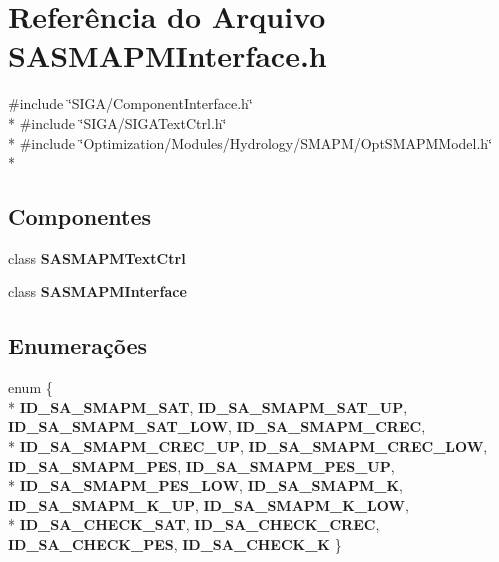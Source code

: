 \section{Referência do Arquivo S\+A\+S\+M\+A\+P\+M\+Interface.\+h}
\label{_s_a_s_m_a_p_m_interface_8h}
{\ttfamily \#include \char`\"{}S\+I\+G\+A/\+Component\+Interface.\+h\char`\"{}}\\*
{\ttfamily \#include \char`\"{}S\+I\+G\+A/\+S\+I\+G\+A\+Text\+Ctrl.\+h\char`\"{}}\\*
{\ttfamily \#include \char`\"{}Optimization/\+Modules/\+Hydrology/\+S\+M\+A\+P\+M/\+Opt\+S\+M\+A\+P\+M\+Model.\+h\char`\"{}}\\*
\subsection*{Componentes}
\begin{DoxyCompactItemize}
\item 
class {\bf S\+A\+S\+M\+A\+P\+M\+Text\+Ctrl}
\item 
class {\bf S\+A\+S\+M\+A\+P\+M\+Interface}
\end{DoxyCompactItemize}
\subsection*{Enumerações}
\begin{DoxyCompactItemize}
\item 
enum \{ \\*
{\bf I\+D\+\_\+\+S\+A\+\_\+\+S\+M\+A\+P\+M\+\_\+\+S\+AT}, 
{\bf I\+D\+\_\+\+S\+A\+\_\+\+S\+M\+A\+P\+M\+\_\+\+S\+A\+T\+\_\+\+UP}, 
{\bf I\+D\+\_\+\+S\+A\+\_\+\+S\+M\+A\+P\+M\+\_\+\+S\+A\+T\+\_\+\+L\+OW}, 
{\bf I\+D\+\_\+\+S\+A\+\_\+\+S\+M\+A\+P\+M\+\_\+\+C\+R\+EC}, 
\\*
{\bf I\+D\+\_\+\+S\+A\+\_\+\+S\+M\+A\+P\+M\+\_\+\+C\+R\+E\+C\+\_\+\+UP}, 
{\bf I\+D\+\_\+\+S\+A\+\_\+\+S\+M\+A\+P\+M\+\_\+\+C\+R\+E\+C\+\_\+\+L\+OW}, 
{\bf I\+D\+\_\+\+S\+A\+\_\+\+S\+M\+A\+P\+M\+\_\+\+P\+ES}, 
{\bf I\+D\+\_\+\+S\+A\+\_\+\+S\+M\+A\+P\+M\+\_\+\+P\+E\+S\+\_\+\+UP}, 
\\*
{\bf I\+D\+\_\+\+S\+A\+\_\+\+S\+M\+A\+P\+M\+\_\+\+P\+E\+S\+\_\+\+L\+OW}, 
{\bf I\+D\+\_\+\+S\+A\+\_\+\+S\+M\+A\+P\+M\+\_\+K}, 
{\bf I\+D\+\_\+\+S\+A\+\_\+\+S\+M\+A\+P\+M\+\_\+\+K\+\_\+\+UP}, 
{\bf I\+D\+\_\+\+S\+A\+\_\+\+S\+M\+A\+P\+M\+\_\+\+K\+\_\+\+L\+OW}, 
\\*
{\bf I\+D\+\_\+\+S\+A\+\_\+\+C\+H\+E\+C\+K\+\_\+\+S\+AT}, 
{\bf I\+D\+\_\+\+S\+A\+\_\+\+C\+H\+E\+C\+K\+\_\+\+C\+R\+EC}, 
{\bf I\+D\+\_\+\+S\+A\+\_\+\+C\+H\+E\+C\+K\+\_\+\+P\+ES}, 
{\bf I\+D\+\_\+\+S\+A\+\_\+\+C\+H\+E\+C\+K\+\_\+K}
 \}
\end{DoxyCompactItemize}
